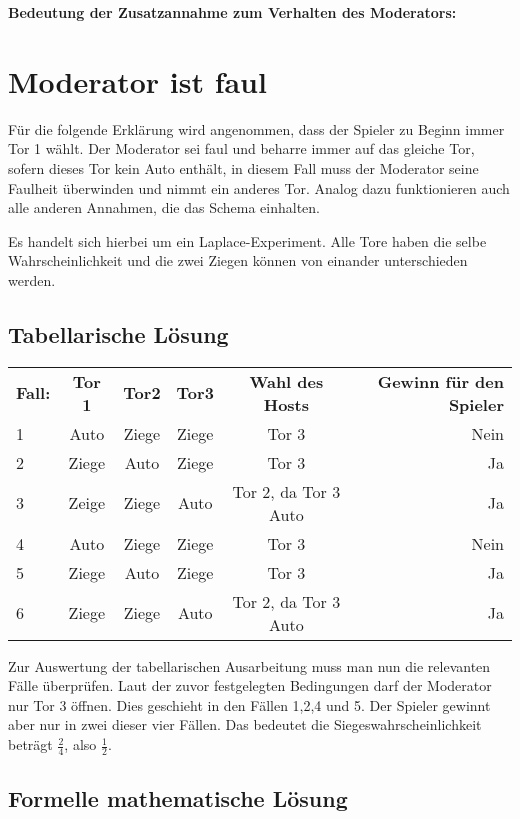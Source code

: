 \textbf{Bedeutung der Zusatzannahme zum Verhalten des Moderators:}

\section{Moderator ist faul}

Für die folgende Erklärung wird angenommen, dass der Spieler zu Beginn immer Tor 1 wählt. Der Moderator sei faul und beharre immer auf das gleiche Tor, sofern dieses
Tor kein Auto enthält, in diesem Fall muss der Moderator seine Faulheit überwinden und nimmt ein anderes Tor. Analog dazu funktionieren auch alle anderen Annahmen,
die das Schema einhalten.

Es handelt sich hierbei um ein Laplace-Experiment. Alle Tore haben die selbe Wahrscheinlichkeit und die zwei Ziegen können von einander unterschieden werden. 

\subsection{Tabellarische Lösung}


\begin{tabular}[h]{lccccr}
    \textbf{Fall:} & \textbf{Tor 1} & \textbf{Tor2} & \textbf{Tor3} & \textbf{Wahl des Hosts} & \textbf{Gewinn für den Spieler} \\
    1 & Auto & Ziege & Ziege & Tor 3 & Nein\\
    2 & Ziege & Auto & Ziege & Tor 3 & Ja\\
    3 & Zeige & Ziege & Auto & Tor 2, da Tor 3 Auto & Ja\\
    4 & Auto & Ziege & Ziege & Tor 3 & Nein\\
    5 & Ziege & Auto & Ziege & Tor 3 & Ja\\
    6 & Ziege & Ziege & Auto & Tor 2, da Tor 3 Auto & Ja\\
\end{tabular}

Zur Auswertung der tabellarischen Ausarbeitung muss man nun die relevanten Fälle überprüfen. Laut der zuvor festgelegten Bedingungen darf der Moderator nur Tor 3 öffnen.
Dies geschieht in den Fällen 1,2,4 und 5. Der Spieler gewinnt aber nur in zwei dieser vier Fällen. Das bedeutet die Siegeswahrscheinlichkeit beträgt $\frac{2}{4}$,
also $\frac{1}{2}$.
\subsection{Formelle mathematische Lösung}


